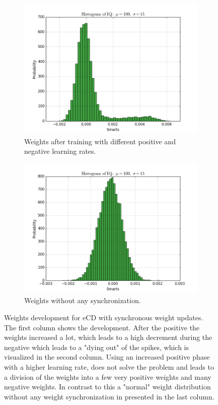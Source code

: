 \begin{figure}[h!]
	
	\begin{subfigure}[t]{.24\textwidth}
  		\centering
  		\includegraphics[width=.9\linewidth]{imgs/app/nest/w_hist_conv_lr.png}
  		\caption{Weights after training with different positive and negative learning rates.}
  		\label{fig:sub2}
	\end{subfigure}
	
	\begin{subfigure}[t]{.24\textwidth}
  		\centering
  		\includegraphics[width=.9\linewidth]{imgs/app/nest/w_hist_normal.png}
  		\caption{Weights without any synchronization.}
  		\label{fig:sub2}
	\end{subfigure}	
	
	\caption{Weights development for eCD with synchronous weight updates. The first column shows the development. After the positive the weights increased a lot, which leads to a high decrement during the negative which leads to a "dying out" of the spikes, which is visualized in the second column. Using an increased positive phase with a higher learning rate, does not solve the problem and leads to a division of the weights into a few very positive weights and many negative weights. In contrast to this a "normal" weight distribution without any weight synchronization in presented in the last column. }
	\label{fig:ecdnest}
\end{figure}

